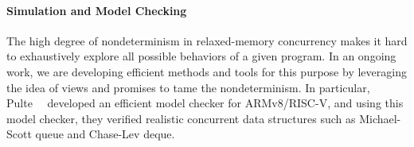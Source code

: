 \paragraph{Simulation and Model Checking}

The high degree of nondeterminism in relaxed-memory concurrency makes it hard to exhaustively
explore all possible behaviors of a given program.  In an ongoing work, we are developing efficient
methods and tools for this purpose by leveraging the idea of views and promises to tame the
nondeterminism.  In particular, Pulte~\etal{}~\cite{promising-armv8-riscv} developed an efficient
model checker for ARMv8/RISC-V, and using this model checker, they verified realistic concurrent
data structures such as Michael-Scott queue and Chase-Lev deque.








